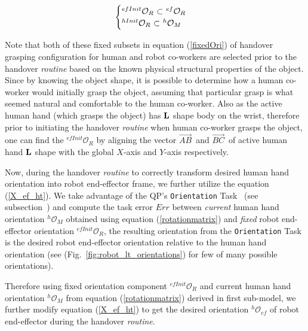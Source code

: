 \begin{equation}\label{fixedOri}
\begin{cases}
{{}^{efInit}\mathcal{O}_R}$ $\subset$ ${{}^{ef}\mathcal{O}_R} \\
{{}^{hInit}\mathcal{O}_R}$ $\subset$ ${{}^{h}\mathcal{O}_M}
\end{cases}
\end{equation}

Note that both of these fixed subsets in equation (\ref{fixedOri}) of handover grasping configuration for human and robot co-workers are selected prior to the handover \textit{routine} based on the known physical structural properties of the object. Since by knowing the object shape, it is possible to determine how a human co-worker would initially grasp the object, assuming that particular grasp is what seemed natural and comfortable to the human co-worker. Also as the active human hand (which grasps the object) has ${\bf L}$ shape body on the wrist, therefore prior to initiating the handover \textit{routine} when human co-worker grasps the object, one can find the ${{}^{efInit}\mathcal{O}_R}$ by aligning the vector $\vec{AB}^{\,}$ and $\vec{BC}^{\,}$ of active human hand ${\bf L}$ shape with the global $X$-axis and $Y$-axis respectively.

Now, during the handover \textit{routine} to correctly transform desired human hand orientation into robot end-effector frame, we further utilize the equation (\ref{X_ef_ht}). We take advantage of the QP's \texttt{Orientation} Task~\cite{murray2017mathematical, ladder-HRP-2Kai} (see subsection~) and compute the task error $Err$ between \textit{current} human hand orientation ${{}^{h}\mathcal{O}_M}$ obtained using equation (\ref{rotationmatrix}) and \textit{fixed} robot end-effector orientation ${{}^{efInit}\mathcal{O}_R}$, the resulting orientation from the \texttt{Orientation} Task is the desired robot end-effector orientation relative to the human hand orientation (see (Fig.~\ref{fig:robot_lt_orientations}) for few of many possible orientations).

Therefore using fixed orientation component  ${{}^{efInit}\mathcal{O}_R}$ and current human hand orientation ${}^{h}\mathcal{O}_M$ from equation (\ref{rotationmatrix}) derived in first sub-model, we further modify equation (\ref{X_ef_ht}) to get the desired orientation $ {}^{h}\mathcal{O}_{ef} $ of robot end-effector during the handover \textit{routine}.


